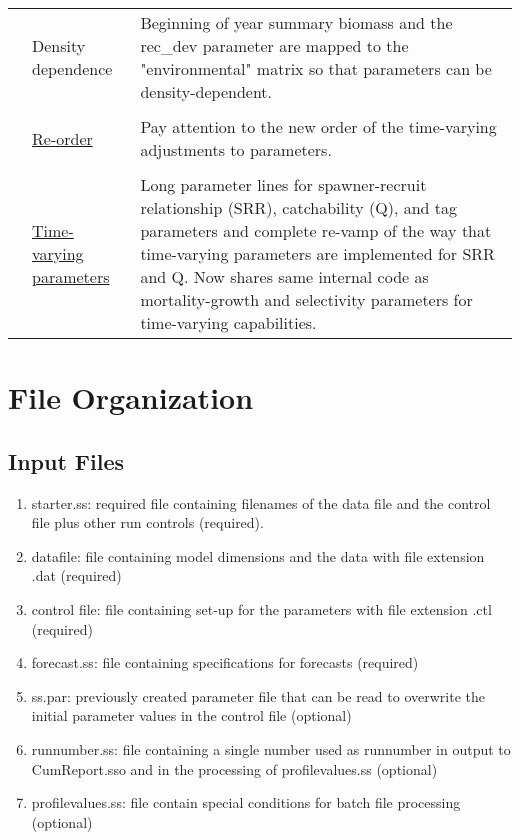 \begin{center}
\begin{longtable}{p{2cm} p{3cm} p{10cm}}
					& Density dependence & 
						Beginning of year summary biomass and the rec\_dev parameter are mapped to the    "environmental" matrix so that parameters can be density-dependent.\\
				  \\						
					& \hyperlink{tvOrder}{Re-order} & 
						Pay attention to the new order of the time-varying adjustments to parameters. \\
				  \\						
					& \hyperlink{time-vary}{Time-varying parameters} & 
						Long parameter lines for spawner-recruit relationship (SRR), catchability (Q), and tag parameters and complete re-vamp of the way that time-varying parameters are implemented for SRR and Q.  Now shares same internal code as mortality-growth and selectivity parameters for time-varying capabilities.\\
				\hline	
			\end{longtable}
		\end{center}

		
\section{File Organization}\label{FileOrganization}		
	\subsection{Input Files}
	\begin{enumerate}
		\item starter.ss:   required file containing filenames of the data file and the control file plus other run controls (required).
		\item datafile:  file containing model dimensions and the data with file extension .dat (required)
		\item control file:  file containing set-up for the parameters with file extension .ctl (required)
		\item forecast.ss:  file containing specifications for forecasts (required) 
		\item ss.par:  previously created parameter file that can be read to overwrite the initial parameter values in the control file (optional)
		\item runnumber.ss:  file containing a single number used as runnumber in output to CumReport.sso and in the processing of profilevalues.ss (optional)
		\item profilevalues.ss:  file contain special conditions for batch file processing (optional)
	\end{enumerate}
	
